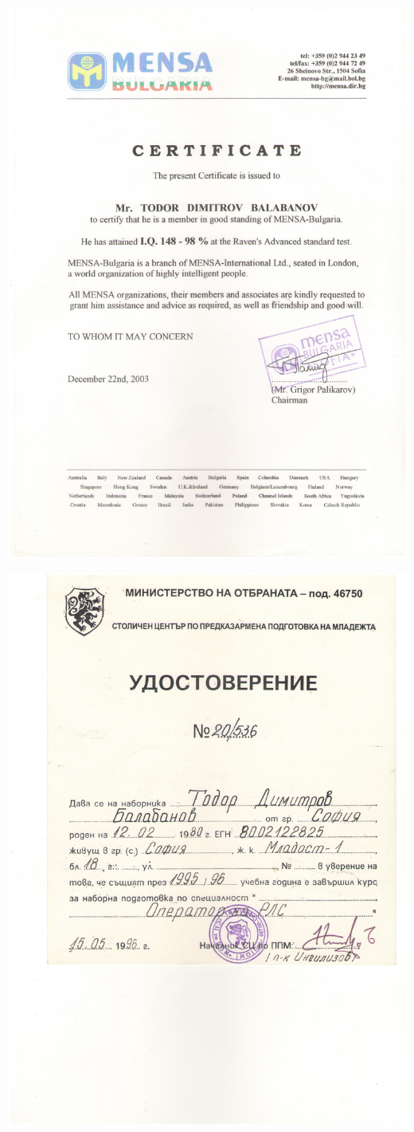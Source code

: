 \documentclass[bulgarian,a4paper]{europasscv}
\begin{document}
\includegraphics[width=\textwidth,height=\textheight,keepaspectratio]{Mensa2003}


\includegraphics[width=\textwidth,height=\textheight,keepaspectratio]{MO1996}
\end{document}
